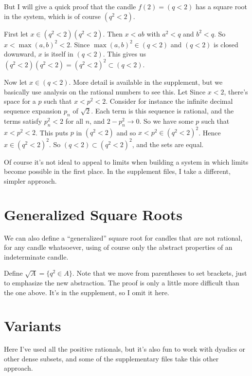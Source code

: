 \documentclass{article}
\newcommand{\q}{\enquote}
\begin{document}
{{But I will give a quick proof that the candle $f(2) = (q < 2)$ has a square root in the system, which is of course $( q^2 < 2)$. 

First let $x \in ( q^2 < 2)( q^2 < 2)$. Then $x < ab$ with $a^2 < q$ and $ b^2 < q$. So $x < \max(a,b)^2 < 2$. Since $\max(a,b)^2 \in (q < 2)$ and $(q < 2)$ is closed downward, $x$ is itself in $(q < 2)$. This gives us $( q^2 < 2)( q^2 < 2) = ( q^2 < 2)^2 \subset (q < 2).$

Now let $x \in (q < 2)$. More detail is available in the supplement, but we basically use analysis on the rational numbers to see this. Let Since $x < 2$, there's space for a $p$ such that $x < p^2 < 2$. Consider for instance the infinite decimal sequence expansion $p_n$ of $\sqrt{2}$. Each term is this sequence is rational, and the terms satisfy $p_n^2 < 2$ for all $n$, and $2 - p_n^2 \to 0$.  So we have some $p$ such that $x < p^2 < 2$. This puts $p$ in $( q^2 < 2)$ and so $x < p^2 \in ( q^2 < 2)^2$. Hence $x \in ( q^2 < 2)^2$. So  $(q < 2) \subset ( q^2 < 2)^2$, and the sets are equal. 

Of course it's not ideal to appeal to limits when building a system in which limits become possible in the first place. In the supplement files, I take a different, simpler approach. 

\section{Generalized Square Roots}

We can also define a \q{generalized} square root for candles that are not rational, for any candle whatsoever, using of course only the abstract properties of an indeterminate candle. 

Define $\sqrt{A} = \{ q^2 \in A \}$. Note that we move from parentheses to set brackets, just to emphasize the new abstraction. The proof is only a little more difficult than the one above. It's in the supplement, so I omit it here. 
 

\section{Variants}
Here I've used all the positive rationals, but it's also fun to work with dyadics or other dense subsets, and some of the supplementary files take this other approach.


}}
\end{document}
